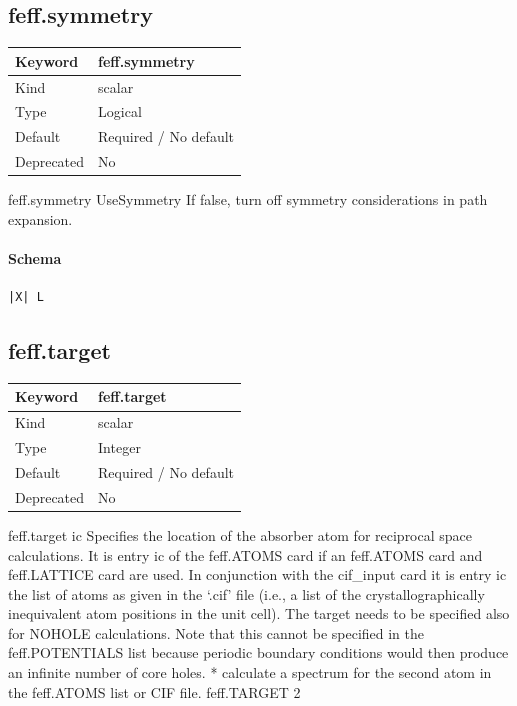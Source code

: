 \documentclass[11pt]{article}
\begin{document}
{{{{\subsection{feff.symmetry}
\label{kw:feff-symmetry}
\begin{longtable}{|p{1.5in}|p{4.5in}|}
\hline
Keyword & feff.symmetry \\
\hline
Kind & scalar \\
\hline
Type & Logical \\
\hline
Default & Required / No default \\
\hline
Deprecated & No \\
\hline
\end{longtable}
 feff.symmetry{ UseSymmetry }
 If false, turn off symmetry considerations in path expansion.

\paragraph{Schema}
\begin{Verbatim}
|X| L
\end{Verbatim}

\subsection{feff.target}
\label{kw:feff-target}
\begin{longtable}{|p{1.5in}|p{4.5in}|}
\hline
Keyword & feff.target \\
\hline
Kind & scalar \\
\hline
Type & Integer \\
\hline
Default & Required / No default \\
\hline
Deprecated & No \\
\hline
\end{longtable}
 feff.target{ ic }
 Specifies the location of the absorber atom for reciprocal space calculations. It is entry ic of the
 feff.ATOMS card if an feff.ATOMS card and feff.LATTICE card are used. In conjunction with the cif\_input
 card it is entry ic the list of atoms as given in the ‘.cif’ file (i.e., a list of the crystallographically
 inequivalent atom positions in the unit cell). The target needs to be specified also for NOHOLE
 calculations. Note that this cannot be specified in the feff.POTENTIALS list because periodic
 boundary conditions would then produce an infinite number of core holes.
 * calculate a spectrum for the second atom in the feff.ATOMS list or CIF file.
 feff.TARGET{ 2 }

}}}}
\end{document}
